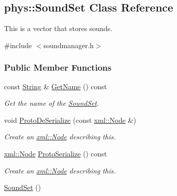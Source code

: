 \hypertarget{classphys_1_1SoundSet}{
\subsection{phys::SoundSet Class Reference}
\label{classphys_1_1SoundSet}
}


This is a vector that stores sounds.  




{\ttfamily \#include $<$soundmanager.h$>$}

\subsubsection*{Public Member Functions}
\begin{DoxyCompactItemize}
\item 
const \hyperlink{namespacephys_aa03900411993de7fbfec4789bc1d392e}{String} \& \hyperlink{classphys_1_1SoundSet_aa26c72befe51f514b24b652932ad1bc9}{GetName} () const 
\begin{DoxyCompactList}\small\item\em Get the name of the \hyperlink{classphys_1_1SoundSet}{SoundSet}. \item\end{DoxyCompactList}\item 
void \hyperlink{classphys_1_1SoundSet_a5734b8cf5370036fea6d41b6659eca8e}{ProtoDeSerialize} (const \hyperlink{classphys_1_1xml_1_1Node}{xml::Node} \&)
\begin{DoxyCompactList}\small\item\em Create an \hyperlink{classphys_1_1xml_1_1Node}{xml::Node} describing this. \item\end{DoxyCompactList}\item 
\hyperlink{classphys_1_1xml_1_1Node}{xml::Node} \hyperlink{classphys_1_1SoundSet_ab8202b748768b338505928cdece9d08c}{ProtoSerialize} () const 
\begin{DoxyCompactList}\small\item\em Create an \hyperlink{classphys_1_1xml_1_1Node}{xml::Node} describing this. \item\end{DoxyCompactList}\item 
\hypertarget{classphys_1_1SoundSet_a87c99d3ef6cda1b6183edc3320636abb}{
\hyperlink{classphys_1_1SoundSet_a87c99d3ef6cda1b6183edc3320636abb}{SoundSet} ()}
\label{classphys_1_1SoundSet_a87c99d3ef6cda1b6183edc3320636abb}


\end{DoxyCompactItemize}
